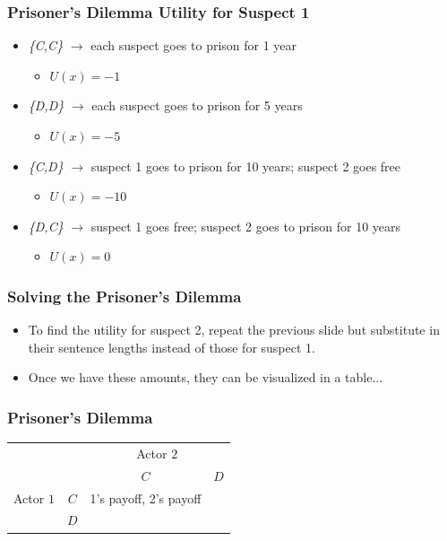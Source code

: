 \documentclass{beamer}
\begin{document}
 \begin{frame} 
	\frametitle{\LARGE{Prisoner's Dilemma Utility for Suspect 1}}
	\begin{itemize}
		\item \emph{\{C,C\}} $\rightarrow$ \pause each suspect goes to prison for 1 year \pause \begin{itemize}
			\item $U(x) = -1$
		\end{itemize}
		\item \emph{\{D,D\}} $\rightarrow$ \pause each suspect goes to prison for 5 years \pause 
		\begin{itemize}
			\item $U(x) = -5$
		\end{itemize}
		\item \emph{\{C,D\}} $\rightarrow$ \pause suspect 1 goes to prison for 10 years; suspect 2 goes free  \pause 
		\begin{itemize}
			\item $U(x) = -10$
		\end{itemize}
		\item \emph{\{D,C\}} $\rightarrow$ \pause suspect 1 goes free; suspect 2 goes to prison for 10 years \pause
		\begin{itemize}
			\item $U(x) = 0$
		\end{itemize}
	\end{itemize}
\end{frame}

\begin{frame} 
	\frametitle{\LARGE{Solving the Prisoner's Dilemma}}
	\begin{itemize}
		\item To find the utility for suspect 2, repeat the previous slide but substitute in their sentence lengths instead of those for suspect 1. \pause
		\item Once we have these amounts, they can be visualized in a table...
	\end{itemize}
\end{frame}

\begin{frame} 
 \frametitle{\LARGE{Prisoner's Dilemma}}
  \begin{table}
  	\LARGE
 	\begin{tabular}{cc|c|c|}
 		& \multicolumn{1}{c}{} & \multicolumn{2}{c}{Actor $2$}\\
 		& \multicolumn{1}{c}{} & \multicolumn{1}{c}{$C$}  & \multicolumn{1}{c}{$D$} \\\cline{3-4}
 		{Actor $1$}  & $C$  & 1's payoff, 2's payoff  &  \\\cline{3-4}
 		&  $D$ &  &  \\\cline{3-4}
 	\end{tabular}
 \end{table}
 \end{frame}
\end{document}
